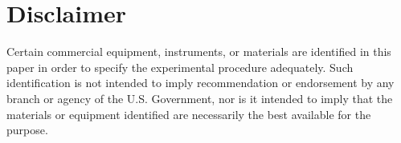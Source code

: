 \section*{Disclaimer}
\label{sec:disclaimer}

Certain commercial equipment, instruments, or materials are identified in this
paper in order to specify the experimental procedure adequately. Such
identification is not intended to imply recommendation or endorsement by any
branch or agency of the U.S. Government, nor is it intended to imply that the
materials or equipment identified are necessarily the best available for the
purpose.

